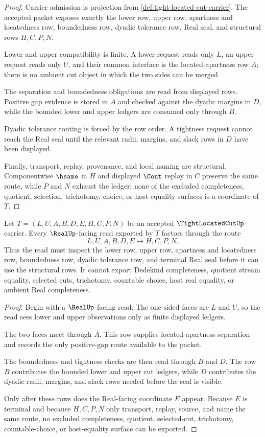 \begin{proof}
Carrier admission is projection from \autoref{def:tight-located-cut-carrier}. The accepted packet exposes exactly the lower row, upper row, apartness and locatedness row, boundedness row, dyadic tolerance row, Real seal, and structural rows $H,C,P,N$.

Lower and upper compatibility is finite. A lower request reads only $L$, an upper request reads only $U$, and their common interface is the located-apartness row $A$; there is no ambient cut object in which the two sides can be merged.

The separation and boundedness obligations are read from displayed rows. Positive gap evidence is stored in $A$ and checked against the dyadic margins in $D$, while the bounded lower and upper ledgers are consumed only through $B$.

Dyadic tolerance routing is forced by the row order. A tightness request cannot reach the Real seal until the relevant radii, margins, and slack rows in $D$ have been displayed.

Finally, transport, replay, provenance, and local naming are structural. Componentwise $\hsame$ in $H$ and displayed $\Cont$ replay in $C$ preserve the same route, while $P$ and $N$ exhaust the ledger; none of the excluded completeness, quotient, selection, trichotomy, choice, or host-equality surfaces is a coordinate of $T$.
\end{proof}

\begin{theorem}
\label{thm:tight-located-cut-two-sided-seal-route}
Let $T=(L,U,A,B,D,E,H,C,P,N)$ be an accepted $\TightLocatedCutUp$ carrier. Every $\RealUp$-facing read exported by $T$ factors through the route
$$
L,U,A,B,D,E \longmapsto H,C,P,N .
$$
Thus the read must inspect the lower row, upper row, apartness and locatedness row, boundedness row, dyadic tolerance row, and terminal Real seal before it can use the structural rows. It cannot export Dedekind completeness, quotient stream equality, selected cuts, trichotomy, countable choice, host real equality, or ambient Real completeness.
\end{theorem}
\begin{proof}
Begin with a $\RealUp$-facing read. The one-sided faces are $L$ and $U$, so the read sees lower and upper observations only as finite displayed ledgers.

The two faces meet through $A$. This row supplies located-apartness separation and records the only positive-gap route available to the packet.

The boundedness and tightness checks are then read through $B$ and $D$. The row $B$ contributes the bounded lower and upper cut ledgers, while $D$ contributes the dyadic radii, margins, and slack rows needed before the seal is visible.

Only after these rows does the Real-facing coordinate $E$ appear. Because $E$ is terminal and because $H,C,P,N$ only transport, replay, source, and name the same route, no excluded completeness, quotient, selected-cut, trichotomy, countable-choice, or host-equality surface can be exported.
\end{proof}

